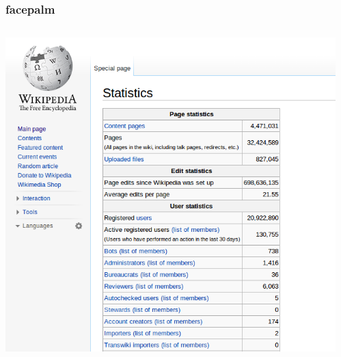 \documentclass{beamer}
\begin{document}
\begin{frame}
  \frametitle{facepalm}
  \begin{columns}
    \begin{column}{0.5\textwidth}
      \includegraphics[height = 0.8\textheight, width = \textwidth, keepaspectratio = true]{figure/wiki_stats}
    \end{column}
    \begin{column}{0.5\textwidth}

\end{column}
\end{columns}
\end{frame}
\end{document}
